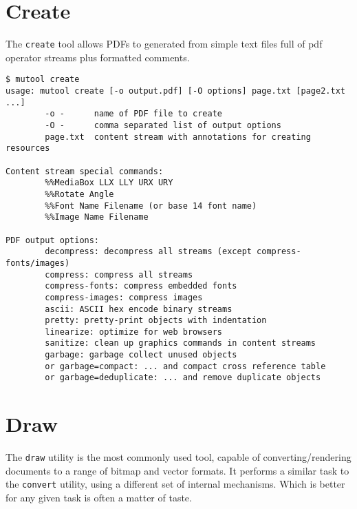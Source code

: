 \documentclass[oneside]{book}
\begin{document}
\section{Create}

The \texttt{create} tool allows PDFs to generated from simple text files full of pdf operator streams plus formatted comments.

\begin{lstlisting}
$ mutool create
usage: mutool create [-o output.pdf] [-O options] page.txt [page2.txt ...]
        -o -      name of PDF file to create
        -O -      comma separated list of output options
        page.txt  content stream with annotations for creating resources

Content stream special commands:
        %%MediaBox LLX LLY URX URY
        %%Rotate Angle
        %%Font Name Filename (or base 14 font name)
        %%Image Name Filename

PDF output options:
        decompress: decompress all streams (except compress-fonts/images)
        compress: compress all streams
        compress-fonts: compress embedded fonts
        compress-images: compress images
        ascii: ASCII hex encode binary streams
        pretty: pretty-print objects with indentation
        linearize: optimize for web browsers
        sanitize: clean up graphics commands in content streams
        garbage: garbage collect unused objects
        or garbage=compact: ... and compact cross reference table
        or garbage=deduplicate: ... and remove duplicate objects
\end{lstlisting}

\section{Draw}

The \texttt{draw} utility is the most commonly used tool, capable of converting/rendering documents to a range of bitmap and vector formats.
It performs a similar task to the \texttt{convert} utility, using a different set of internal mechanisms. Which is better for any given task is often a matter of taste.
\end{document}
